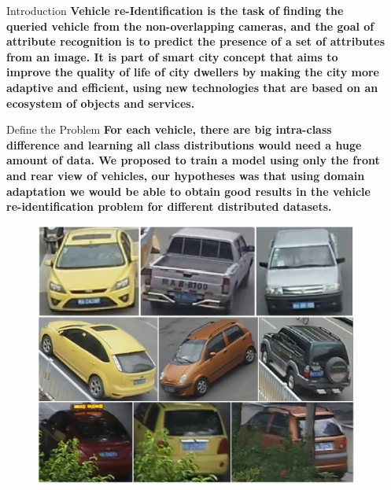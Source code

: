 \documentclass[final]{beamer}
\newlength{\sepmargin}
\newlength{\onecolwid}
\begin{document}
  \setlength{\belowcaptionskip}{2ex} %
  \setlength\belowdisplayshortskip{1ex} %
  

\begin{frame}[t] 
\begin{columns}[t] 
\begin{column}{\sepmargin}\end{column}
\begin{column}{\onecolwid} %
\vspace{1em}
  \begin{block}{Introduction}
\textbf{Vehicle re-Identification is the task of finding the queried vehicle from the non-overlapping cameras, and the goal of attribute recognition is to predict the presence of a set of attributes from an image. It is part of smart city concept that aims to improve the quality of life of city dwellers by making the city more adaptive and efficient, using new technologies that are based on an ecosystem of objects and services.}
\end{block}
          
\begin{block}{Define the Problem}
\textbf{For each vehicle, there are big intra-class difference and learning all class distributions would need a huge amount of data. We proposed to train a model using only the front and rear view of vehicles, our hypotheses was that using domain adaptation we would be able to obtain good results in the vehicle re-identification problem for different distributed datasets.}

\begin{figure}
\vspace*{0.2cm}
\includegraphics[width=0.45\linewidth]{images/compil.png}
\end{figure}


\end{block}
\end{column}
\end{columns}
\end{frame}
\end{document}

